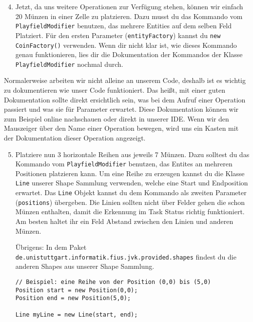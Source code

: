 \begin{enumerate} \setcounter{enumi}{3}
    \item Jetzt, da uns weitere Operationen zur Verfügung stehen, können wir einfach 20 Münzen in einer Zelle zu platzieren. 
        Dazu musst du das Kommando vom \lstinline{PlayfieldModifier} benutzen, das mehrere Entities auf dem selben Feld Platziert.
        Für den ersten Parameter (\lstinline{entityFactory}) kannst du \lstinline{new CoinFactory()} verwenden. 
        Wenn dir nicht klar ist, wie dieses Kommando genau funktionieren, lies dir die Dokumentation der Kommandos der Klasse \lstinline{PlayfieldModifier} nochmal durch.
\end{enumerate}

\begin{Infobox}
    Normalerweise arbeiten wir nicht alleine an unserem Code, deshalb ist es wichtig zu dokumentieren wie unser Code funktioniert. 
    Das heißt, mit einer guten Dokumentation sollte direkt ersichtlich sein, was bei dem Aufruf einer Operation passiert und was sie für Parameter erwartet. 
    Diese Dokumentation können wir zum Beispiel online nachschauen oder direkt in unserer IDE. 
    Wenn wir den Mauszeiger über den Name einer Operation bewegen, wird uns ein Kasten mit der Dokumentation dieser Operation angezeigt.
\end{Infobox}


\begin{enumerate} \setcounter{enumi}{4}
    \item Platziere nun 3 horizontale Reihen aus jeweils 7 Münzen. 
        Dazu solltest du das Kommando vom \lstinline{PlayfieldModifier} benutzen, das Entites an mehreren Positionen platzieren kann.
        Um eine Reihe zu erzeugen kannst du die Klasse \lstinline{Line} unserer Shape Sammlung verwenden, welche eine Start und Endposition erwartet.
        Das \lstinline{Line} Objekt kannst du dem Kommando als zweiten Parameter (\lstinline{positions}) übergeben.
        Die Linien sollten nicht über Felder gehen die schon Münzen enthalten, damit die Erkennung im Task Status richtig funktioniert.
        Am besten haltet ihr ein Feld Abstand zwischen den Linien und anderen Münzen.

        Übrigens: In dem Paket \texttt{de.unistuttgart.informatik.fius.jvk.provided.shapes} findest du die anderen Shapes aus unserer Shape Sammlung.

    \begin{lstlisting}
// Beispiel: eine Reihe von der Position (0,0) bis (5,0)
Position start = new Position(0,0);
Position end = new Position(5,0);

Line myLine = new Line(start, end);
    \end{lstlisting}

\end{enumerate}

